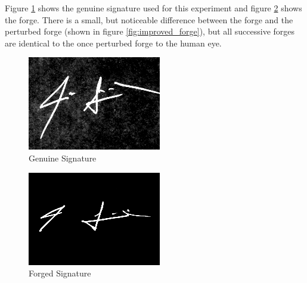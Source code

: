 Figure \ref{fig:genuine} shows the genuine signature used for this experiment and figure \ref{fig:forge} shows the forge.
There is a small, but noticeable difference between the forge and the perturbed forge (shown in figure \ref{fig:improved_forge}), but all successive forges are identical to the once perturbed forge to the human eye.
\begin{figure}[h]
    \begin{center}
        \includegraphics[width=0.8\linewidth]{original_1_1_transformed.png}
    \end{center}
    \caption{Genuine Signature}
    \label{fig:genuine}
\end{figure}
\begin{figure}[h]
    \begin{center}
        \includegraphics[width=0.8\linewidth]{forgeries_1_1_transformed.png}
    \end{center}
    \caption{Forged Signature}
    \label{fig:forge}
\end{figure}
